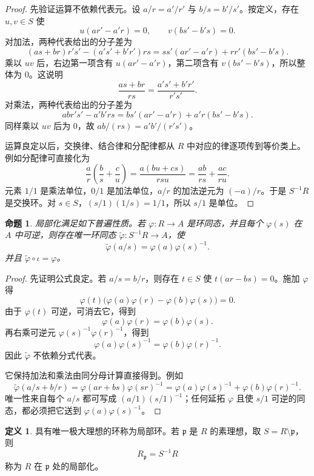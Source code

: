 \documentclass[11pt,a4paper,openany]{ctexbook}
\numberwithin{equation}{chapter}
\theoremstyle{plain}
\newtheorem{proposition}[theorem]{命题}
\theoremstyle{definition}
\newtheorem{definition}[theorem]{定义}
\theoremstyle{remark}
\begin{document}
\begin{proof}
先验证运算不依赖代表元。设 $a/r=a'/r'$ 与 $b/s=b'/s'$。按定义，存在 $u,v\in S$ 使
\[
u(ar'-a'r)=0,\qquad v(bs'-b's)=0.
\]
对加法，两种代表给出的分子差为
\[
(as+br)r's'-(a's'+b'r')rs
=ss'(ar'-a'r)+rr'(bs'-b's).
\]
乘以 $uv$ 后，右边第一项含有 $u(ar'-a'r)$，第二项含有 $v(bs'-b's)$，所以整体为 $0$。这说明
\[
\frac{as+br}{rs}=\frac{a's'+b'r'}{r's'}.
\]
对乘法，两种代表给出的分子差为
\[
ab r's'-a'b'rs=bs'(ar'-a'r)+a'r(bs'-b's).
\]
同样乘以 $uv$ 后为 $0$，故 $ab/(rs)=a'b'/(r's')$。

运算良定以后，交换律、结合律和分配律都从 $R$ 中对应的律逐项传到等价类上。例如分配律可直接化为
\[
\frac a r\left(\frac b s+\frac c u\right)
=\frac{a(bu+cs)}{rsu}
=\frac{ab}{rs}+\frac{ac}{ru}.
\]
元素 $1/1$ 是乘法单位，$0/1$ 是加法单位，$a/r$ 的加法逆元为 $(-a)/r$。于是 $S^{-1}R$ 是交换环。对 $s\in S$，$(s/1)(1/s)=1/1$，所以 $s/1$ 是单位。
\end{proof}

\begin{proposition}
局部化满足如下普遍性质。若 $\varphi:R\to A$ 是环同态，并且每个 $\varphi(s)$ 在 $A$ 中可逆，则存在唯一环同态 $\widetilde\varphi:S^{-1}R\to A$，使
\[
\widetilde\varphi(a/s)=\varphi(a)\varphi(s)^{-1}.
\]
并且 $\widetilde\varphi\circ\iota=\varphi$。
\end{proposition}

\begin{proof}
先证明公式良定。若 $a/s=b/r$，则存在 $t\in S$ 使 $t(ar-bs)=0$。施加 $\varphi$ 得
\[
\varphi(t)\bigl(\varphi(a)\varphi(r)-\varphi(b)\varphi(s)\bigr)=0.
\]
由于 $\varphi(t)$ 可逆，可消去它，得到
\[
\varphi(a)\varphi(r)=\varphi(b)\varphi(s).
\]
再右乘可逆元 $\varphi(s)^{-1}\varphi(r)^{-1}$，得到
\[
\varphi(a)\varphi(s)^{-1}=\varphi(b)\varphi(r)^{-1}.
\]
因此 $\widetilde\varphi$ 不依赖分式代表。

它保持加法和乘法由同分母计算直接得到。例如
\[
\widetilde\varphi(a/s+b/r)
=\varphi(ar+bs)\varphi(sr)^{-1}
=\varphi(a)\varphi(s)^{-1}+\varphi(b)\varphi(r)^{-1}.
\]
唯一性来自每个 $a/s$ 都可写成 $(a/1)(s/1)^{-1}$；任何延拓 $\varphi$ 且使 $s/1$ 可逆的同态，都必须把它送到 $\varphi(a)\varphi(s)^{-1}$。
\end{proof}

\begin{definition}
具有唯一极大理想的环称为局部环。若 $\mathfrak p$ 是 $R$ 的素理想，取 $S=R\setminus\mathfrak p$，则
\[
R_{\mathfrak p}=S^{-1}R
\]
称为 $R$ 在 $\mathfrak p$ 处的局部化。
\end{definition}
\end{document}
